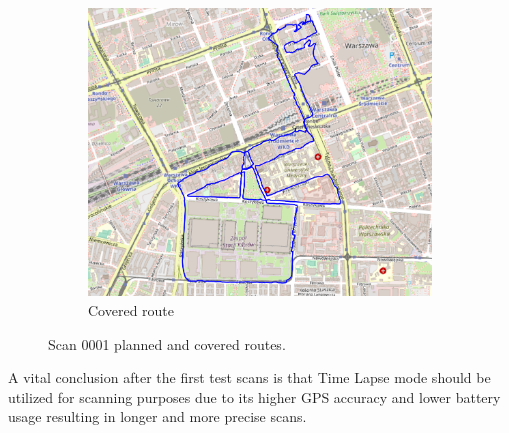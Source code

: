\documentclass[a4paper,12pt]{book}
\begin{document}
\begin{enumerate}
\begin{figure}[H]
\begin{subfigure}{.88\textwidth}
			\includegraphics[width=1\linewidth]{route_c1}
			\caption{Covered route}
			\label{fig:b1}
		\end{subfigure}
		\caption{Scan 0001 planned and covered routes.}
		\label{fig:fig1}
	\end{figure}
\end{enumerate}
A vital conclusion after the first test scans is that Time Lapse mode should be utilized for scanning purposes due to its higher GPS accuracy and lower battery usage resulting in longer and more precise scans.
\end{document}
